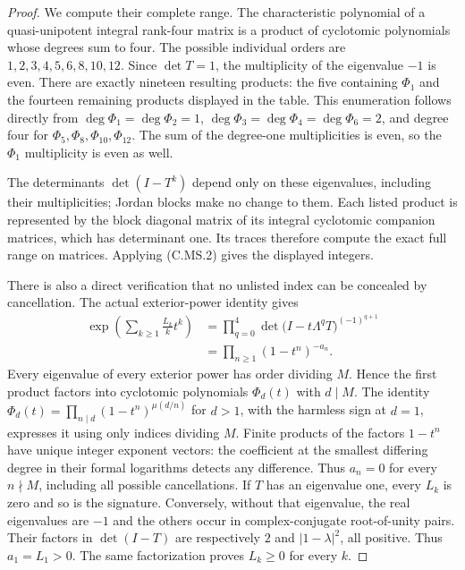 \begin{proof}
We compute their complete range. The characteristic
polynomial of a quasi-unipotent integral rank-four
matrix is a product of cyclotomic polynomials
whose degrees sum to four. The possible individual
orders are
$1,2,3,4,5,6,8,10,12$. Since $\det T=1$,
the multiplicity of the eigenvalue $-1$ is even.
There are exactly nineteen resulting products:
the five containing $\Phi_1$ and the fourteen
remaining products displayed in the table.
This enumeration follows directly from
$\deg\Phi_1=\deg\Phi_2=1$,
$\deg\Phi_3=\deg\Phi_4=\deg\Phi_6=2$,
and degree four for $\Phi_5,\Phi_8,\Phi_{10},
\Phi_{12}$. The sum of the degree-one
multiplicities is even, so the $\Phi_1$
multiplicity is even as well.

The determinants $\det(I-T^k)$ depend only on
these eigenvalues, including their multiplicities;
Jordan blocks make no change to them. Each listed
product is represented by the block diagonal
matrix of its integral cyclotomic companion
matrices, which has determinant one. Its traces
therefore compute the exact full range on
matrices. Applying (C.MS.2) gives the displayed
integers.

There is also a direct verification that no
unlisted index can be concealed by cancellation.
The actual exterior-power identity gives
\[
 \begin{aligned}
 \exp\!\left(\sum_{k\ge1}\frac{L_k}{k}t^k\right)
 &=\prod_{q=0}^4
       \det\bigl(I-t\Lambda^qT\bigr)^{(-1)^{q+1}}\\
 &=\prod_{n\ge1}(1-t^n)^{-a_n}.
 \end{aligned}                                  \tag{C.MS.7}
\]
Every eigenvalue of every exterior power has
order dividing $M$. Hence the first product
factors into cyclotomic polynomials $\Phi_d(t)$
with $d\mid M$. The identity
$\Phi_d(t)=\prod_{n\mid d}(1-t^n)^{\mu(d/n)}$
for $d>1$, with the harmless sign at $d=1$,
expresses it using only indices dividing $M$.
Finite products of the factors $1-t^n$ have
unique integer exponent vectors: the coefficient
at the smallest differing degree in their
formal logarithms detects any difference.
Thus $a_n=0$ for every $n\nmid M$, including
all possible cancellations. If $T$ has an
eigenvalue one, every $L_k$ is zero and so is
the signature. Conversely, without that
eigenvalue, the real eigenvalues are $-1$
and the others occur in complex-conjugate
root-of-unity pairs. Their factors in
$\det(I-T)$ are respectively $2$ and
$|1-\lambda|^2$, all positive. Thus $a_1=L_1>0$.
The same factorization proves $L_k\ge0$ for
every $k$.


\end{proof}
